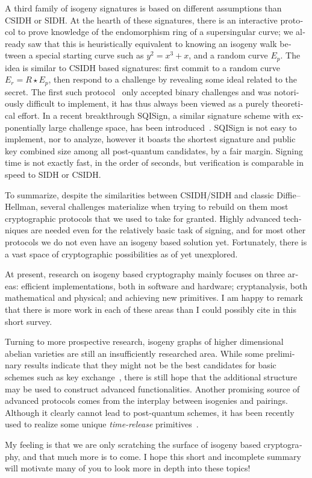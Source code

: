 \begin{otherlanguage}{english}
A third family of isogeny signatures is based on different assumptions
than CSIDH or SIDH. At the hearth of these signatures, there is an
interactive protocol to prove knowledge of the endomorphism ring of a
supersingular curve; we already saw that this is heuristically
equivalent to knowing an isogeny walk between a special starting curve
such as $y^2=x^3+x$, and a random curve $E_p$. The idea is similar to
CSIDH based signatures: first commit to a random curve
$E_r=R\star E_p$, then respond to a challenge by revealing some ideal
related to the secret. The first such
protocol~\cite{AC:GalPetSil17,JC:GalPetSil20} only accepted binary
challenges and was notoriously difficult to implement, it has thus
always been viewed as a purely theoretical effort. In a recent
breakthrough SQISign, a similar signature scheme with exponentially
large challenge space, has been introduced~\cite{AC:DKLPW20}.  SQISign
is not easy to implement, nor to analyze, however it boasts the
shortest signature and public key combined size among all post-quantum
candidates, by a fair margin. Signing time is not exactly fast, in the
order of seconds, but verification is comparable in speed to SIDH or
CSIDH.

To summarize, despite the similarities between CSIDH/SIDH and classic
Diffie--Hellman, several challenges materialize when trying to rebuild
on them most cryptographic protocols that we used to take for granted.
Highly advanced techniques are needed even for the relatively basic
task of signing, and for most other protocols we do not even have an
isogeny based solution yet. Fortunately, there is a vast space of
cryptographic possibilities as of yet unexplored.

At present, research on isogeny based cryptography mainly focuses on
three areas: efficient implementations, both in software and hardware;
cryptanalysis, both mathematical and physical; and achieving new
primitives. I am happy to remark that there is more work in each of
these areas than I could possibly cite in this short survey.

Turning to more prospective research, isogeny graphs of higher
dimensional abelian varieties are still an insufficiently researched
area. While some preliminary results indicate that they might not be
the best candidates for basic schemes such as key
exchange~\cite{PQCRYPTO:FlyTi19,10.1515/jmc-2019-0021,PQCRYPTO:CosSmi20},
there is still hope that the additional structure may be used to
construct advanced functionalities. Another promising source of
advanced protocols comes from the interplay between isogenies and
pairings. Although it clearly cannot lead to post-quantum schemes, it
has been recently used to realize some unique \emph{time-release}
primitives~\cite{AC:DMPS19,EPRINT:BurDeF20}.

My feeling is that we are only scratching the surface of isogeny based
cryptography, and that much more is to come. I hope this short and
incomplete summary will motivate many of you to look more in depth
into these topics!

\end{otherlanguage}

